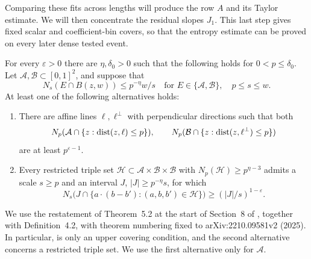 Comparing these fits across lengths will produce the row \(A\) and
its Taylor estimate.  We will then concentrate the residual slopes
\(J_1\).  This last step gives fixed scalar and coefficient-bin covers,
so that the entropy estimate can be proved on every later dense tested
event.


\begin{theorem}\label{a04:planar-input}
For every \(\varepsilon>0\) there are \(\eta,\delta_0>0\) such that the
following holds for \(0<p\le\delta_0\).
Let \(\mathcal A,\mathcal B\subset[0,1]^2\), and suppose that
\begin{equation}\label{a04:planar-regularity}
 N_s(E\cap B(z,w))\le p^{-\eta}w/s
 \quad\text{for }E\in\{\mathcal A,\mathcal B\},\quad p\le s\le w.
\end{equation}
At least one of the following alternatives holds:
\begin{enumerate}
\item There are affine lines \(\ell,\ell^\perp\) with perpendicular
directions such that both
\[
 N_p(\mathcal A\cap\{z:\operatorname{dist}(z,\ell)\le p\}),\qquad
 N_p(\mathcal B\cap\{z:\operatorname{dist}(z,\ell^\perp)\le p\})
\]
are at least \(p^{\varepsilon-1}\).
\item Every restricted triple set
\(\mathcal H\subset\mathcal A\times\mathcal B\times\mathcal B\)
with \(N_p(\mathcal H)\ge p^{\eta-3}\) admits a scale \(s\ge p\) and
an interval \(J\), \(|J|\ge p^{-\eta}s\), for which
\[
 N_s\bigl(J\cap
       \{a\cdot(b-b'):(a,b,b')\in\mathcal H\}\bigr)
       \ge(|J|/s)^{1-\varepsilon}.
\]
\end{enumerate}
\end{theorem}

We use the restatement of Theorem~5.2 at the start of Section~8 of
\citet{WangZahlSticky}, together with Definition~4.2, with theorem
numbering fixed to arXiv:2210.09581v2 (2025).
In particular,  is only an upper covering
condition, and the second alternative concerns a restricted triple set.
We use the first alternative only for \(\mathcal A\).

